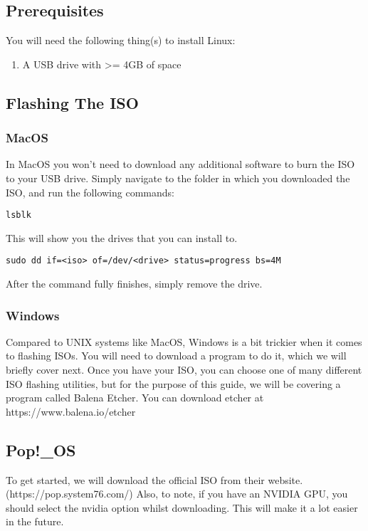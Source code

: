 \documentclass {report}
\begin{document}
\subsection{Prerequisites}
You will need the following thing(s) to install Linux:
\begin{enumerate}
  \item A USB drive with >= 4GB of space
\end{enumerate}

\subsection {Flashing The ISO}

\subsubsection{MacOS}
In MacOS you won't need to download any additional software to burn the ISO to your USB drive. Simply navigate to the folder in which you downloaded the ISO, and run the following commands:

\begin{lstlisting}
lsblk
\end{lstlisting}

This will show you the drives that you can install to.

\begin{lstlisting}
sudo dd if=<iso> of=/dev/<drive> status=progress bs=4M
\end{lstlisting}

After the command fully finishes, simply remove the drive.

\subsubsection{Windows}
Compared to UNIX systems like MacOS, Windows is a bit trickier when it comes to flashing ISOs. You will need to download a program to do it, which we will briefly cover next. Once you have your ISO, you can choose one of many different ISO flashing utilities, but for the purpose of this guide, we will be covering a program called Balena Etcher. 
You can download etcher at https://www.balena.io/etcher


\subsection{Pop!\_OS}
To get started, we will download the official ISO from their website. (https://pop.system76.com/) Also, to note, if you have an NVIDIA GPU, you should select the nvidia option whilst downloading. This will make it a lot easier in the future.
\end{document}
